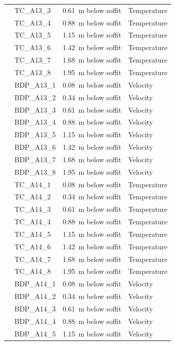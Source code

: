 \documentclass[12pt,oneside]{book}
\begin{document}
\begin{longtable}[c]{c|lll}
 & TC\_A13\_3  & 0.61~m below soffit  & Temperature \\
 & TC\_A13\_4  & 0.88~m below soffit  & Temperature \\
 & TC\_A13\_5  & 1.15~m below soffit  & Temperature \\
 & TC\_A13\_6  & 1.42~m below soffit  & Temperature \\
 & TC\_A13\_7  & 1.68~m below soffit  & Temperature \\
 & TC\_A13\_8  & 1.95~m below soffit  & Temperature \\
\cline{2-4}
 & BDP\_A13\_1 & 0.08~m below soffit  & Velocity \\
 & BDP\_A13\_2 & 0.34~m below soffit  & Velocity \\
 & BDP\_A13\_3 & 0.61~m below soffit  & Velocity \\
 & BDP\_A13\_4 & 0.88~m below soffit  & Velocity \\
 & BDP\_A13\_5 & 1.15~m below soffit  & Velocity \\
 & BDP\_A13\_6 & 1.42~m below soffit  & Velocity \\
 & BDP\_A13\_7 & 1.68~m below soffit  & Velocity \\
 & BDP\_A13\_8 & 1.95~m below soffit  & Velocity \\
\bottomrule
\newpage
\multirow{16}{*}{\large{\textbf{A14}}}
 & TC\_A14\_1  & 0.08~m below soffit  & Temperature \\
 & TC\_A14\_2  & 0.34~m below soffit  & Temperature \\
 & TC\_A14\_3  & 0.61~m below soffit  & Temperature \\
 & TC\_A14\_4  & 0.88~m below soffit  & Temperature \\
 & TC\_A14\_5  & 1.15~m below soffit  & Temperature \\
 & TC\_A14\_6  & 1.42~m below soffit  & Temperature \\
 & TC\_A14\_7  & 1.68~m below soffit  & Temperature \\
 & TC\_A14\_8  & 1.95~m below soffit  & Temperature \\
\cline{2-4}
 & BDP\_A14\_1 & 0.08~m below soffit  & Velocity \\
 & BDP\_A14\_2 & 0.34~m below soffit  & Velocity \\
 & BDP\_A14\_3 & 0.61~m below soffit  & Velocity \\
 & BDP\_A14\_4 & 0.88~m below soffit  & Velocity \\
 & BDP\_A14\_5 & 1.15~m below soffit  & Velocity \\

\end{longtable}
\end{document}
